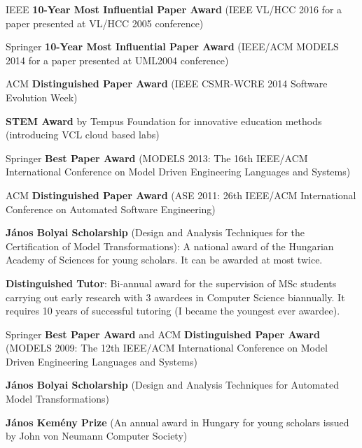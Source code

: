 \documentclass{xetexCV}
\begin{document}

IEEE  \textbf{10-Year Most Influential Paper Award} \newline (IEEE VL/HCC 2016 for a paper presented at VL/HCC 2005 conference) 

Springer  \textbf{10-Year Most Influential Paper Award} \newline (IEEE/ACM MODELS 2014 for a paper presented at UML2004 conference) 

ACM \textbf{Distinguished Paper Award} \newline (IEEE CSMR-WCRE 2014 Software Evolution Week) 

\textbf{STEM Award}  by Tempus Foundation \newline for innovative education methods (introducing VCL cloud based labs)

Springer  \textbf{Best Paper Award} (MODELS 2013: The 16th IEEE/ACM International Conference on Model Driven 
Engineering Languages and Systems) 

ACM \textbf{Distinguished Paper Award} (ASE 2011: 26th IEEE/ACM International Conference on Automated Software Engineering) 

\textbf{J\'anos Bolyai Scholarship} (Design and Analysis Techniques
for the Certification of Model Transformations): A national
award of the Hungarian Academy of Sciences for young scholars. It can be awarded
at most twice.

\textbf{Distinguished Tutor}:  Bi-annual award for the supervision
of MSc students carrying out early research with 3 awardees in Computer
Science biannually. It requires 10 years of successful tutoring (I
became the youngest ever awardee). 

Springer \textbf{Best Paper Award} and ACM \textbf{Distinguished Paper Award} \newline (MODELS
2009: The 12th IEEE/ACM International Conference on Model Driven Engineering Languages and
Systems) 

\textbf{J\'anos Bolyai Scholarship}  (Design and Analysis Techniques
for Automated Model Transformations) 

\textbf{J\'anos Kem\'eny Prize } (An annual
award in Hungary for young scholars issued by John von Neumann Computer Society)

\end{document}
